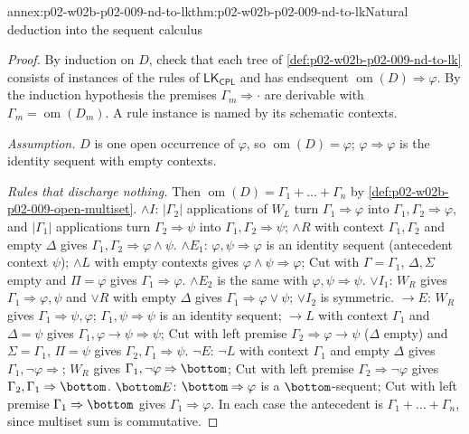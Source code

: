 \begin{annexitem}{annex:p02-w02b-p02-009-nd-to-lk}{thm:p02-w02b-p02-009-nd-to-lk}{Natural deduction into the sequent calculus}
\begin{proof}
By induction on \(D\), check that each tree of
\cref{def:p02-w02b-p02-009-nd-to-lk} consists of instances of the rules of
\(\mathsf{LK}_{\mathsf{CPL}}\) and has endsequent
\(\operatorname{om}(D)\Rightarrow\varphi\).  By the induction hypothesis the
premises \(\Gamma_m\Rightarrow\cdot\) are derivable with
\(\Gamma_m=\operatorname{om}(D_m)\).  A rule instance is named by its
schematic contexts.

\emph{Assumption.}  \(D\) is one open occurrence of \(\varphi\), so
\(\operatorname{om}(D)=\varphi\); \(\varphi\Rightarrow\varphi\) is the
identity sequent with empty contexts.

\emph{Rules that discharge nothing.}  Then
\(\operatorname{om}(D)=\Gamma_1+\dots+\Gamma_n\) by
\cref{def:p02-w02b-p02-009-open-multiset}.
\(\land I\): \(|\Gamma_2|\) applications of \(W_L\) turn
\(\Gamma_1\Rightarrow\varphi\) into \(\Gamma_1,\Gamma_2\Rightarrow\varphi\),
and \(|\Gamma_1|\) applications turn \(\Gamma_2\Rightarrow\psi\) into
\(\Gamma_1,\Gamma_2\Rightarrow\psi\); \(\land R\) with context
\(\Gamma_1,\Gamma_2\) and empty \(\Delta\) gives
\(\Gamma_1,\Gamma_2\Rightarrow\varphi\land\psi\).
\(\land E_1\): \(\varphi,\psi\Rightarrow\varphi\) is an identity sequent
(antecedent context \(\psi\)); \(\land L\) with empty contexts gives
\(\varphi\land\psi\Rightarrow\varphi\); Cut with \(\Gamma=\Gamma_1\),
\(\Delta,\Sigma\) empty and \(\Pi=\varphi\) gives
\(\Gamma_1\Rightarrow\varphi\).  \(\land E_2\) is the same with
\(\varphi,\psi\Rightarrow\psi\).
\(\lor I_1\): \(W_R\) gives \(\Gamma_1\Rightarrow\varphi,\psi\) and
\(\lor R\) with empty \(\Delta\) gives
\(\Gamma_1\Rightarrow\varphi\lor\psi\); \(\lor I_2\) is symmetric.
\(\to E\): \(W_R\) gives \(\Gamma_1\Rightarrow\psi,\varphi\);
\(\Gamma_1,\psi\Rightarrow\psi\) is an identity sequent; \(\to L\) with
context \(\Gamma_1\) and \(\Delta=\psi\) gives
\(\Gamma_1,\varphi\to\psi\Rightarrow\psi\); Cut with left premise
\(\Gamma_2\Rightarrow\varphi\to\psi\) (\(\Delta\) empty) and \(\Sigma=\Gamma_1\),
\(\Pi=\psi\) gives \(\Gamma_2,\Gamma_1\Rightarrow\psi\).
\(\neg E\): \(\neg L\) with context \(\Gamma_1\) and empty \(\Delta\) gives
\(\Gamma_1,\neg\varphi\Rightarrow{}\); \(W_R\) gives
\(\Gamma_1,\neg\varphi\Rightarrow\bottom\); Cut with left premise
\(\Gamma_2\Rightarrow\neg\varphi\) gives \(\Gamma_2,\Gamma_1\Rightarrow\bottom\).
\(\bottom E\): \(\bottom\Rightarrow\varphi\) is a \(\bottom\)-sequent; Cut
with left premise \(\Gamma_1\Rightarrow\bottom\) gives
\(\Gamma_1\Rightarrow\varphi\).
In each case the antecedent is \(\Gamma_1+\dots+\Gamma_n\), since multiset
sum is commutative.


\end{proof}
\end{annexitem}
